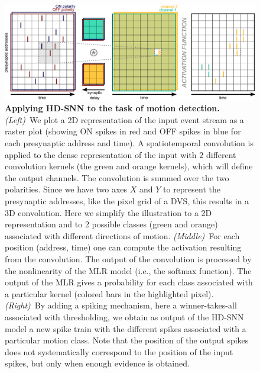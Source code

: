 \documentclass[default]{sn-jnl}%
\theoremstyle{thmstyleone}%
\theoremstyle{thmstyletwo}%
\theoremstyle{thmstylethree}%
\begin{document}
\begin{figure}%
    \centering
    \includegraphics[width=\linewidth]{figures/HDSNN_conv.pdf}
    \caption{
        \textbf{Applying HD-SNN to the task of motion detection.} \textit{(Left)}~We plot a 2D representation of the input event stream as a raster plot (showing ON spikes in red and OFF spikes in blue for each presynaptic address and time). A spatiotemporal convolution is applied to the dense representation of the input with $2$ different convolution kernels (the green and orange kernels), which will define the output channels. The convolution is summed over the two polarities. Since we have two axes $X$ and $Y$ to represent the presynaptic addresses, like the pixel grid of a DVS, this results in a 3D convolution. Here we simplify the illustration to a 2D representation and to 2 possible classes (green and orange) associated with different directions of motion. \textit{(Middle)}~For each position (address, time) one can compute the activation resulting from the convolution. The output of the convolution is processed by the nonlinearity of the MLR model (i.e., the softmax function). The output of the MLR gives a probability for each class associated with a particular kernel (colored bars in the highlighted pixel). \textit{(Right)}~By adding a spiking mechanism, here a winner-takes-all associated with thresholding, we obtain as output of the HD-SNN model a new spike train with the different spikes associated with a particular motion class. Note that the position of the output spikes does not systematically correspond to the position of the input spikes, but only when enough evidence is obtained.
    }
    \label{fig:model}
\end{figure}
\end{document}
